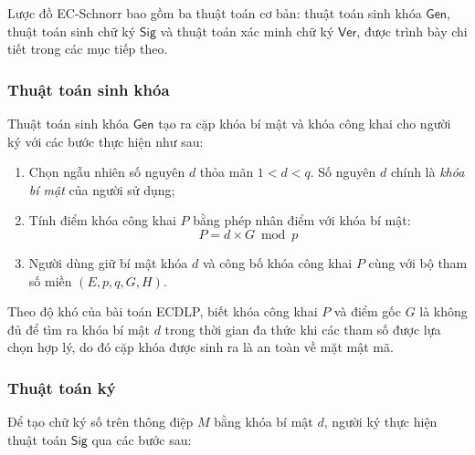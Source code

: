 Lược đồ EC-Schnorr bao gồm ba thuật toán cơ bản: thuật toán sinh khóa $\textsf{Gen}$, thuật toán sinh chữ ký $\textsf{Sig}$ và thuật toán xác minh chữ ký $\textsf{Ver}$, được trình bày chi tiết trong các mục tiếp theo.

\subsubsection{Thuật toán sinh khóa}

Thuật toán sinh khóa $\textsf{Gen}$ tạo ra cặp khóa bí mật và khóa công khai cho người ký với các bước thực hiện như sau:

\begin{enumerate}
    \item Chọn ngẫu nhiên số nguyên $d$ thỏa mãn $1 < d < q$. Số nguyên $d$ chính là \textit{khóa bí mật} của người sử dụng;
    \item Tính điểm khóa công khai $P$ bằng phép nhân điểm với khóa bí mật:
    \begin{equation}
        P = d \times G \bmod p
        \label{eq:ec-schnorr-keygen}
    \end{equation}
    \item Người dùng giữ bí mật khóa $d$ và công bố khóa công khai $P$ cùng với bộ tham số miền $(E, p, q, G, H)$.
\end{enumerate}

Theo độ khó của bài toán ECDLP, biết khóa công khai $P$ và điểm gốc $G$ là không đủ để tìm ra khóa bí mật $d$ trong thời gian đa thức khi các tham số được lựa chọn hợp lý, do đó cặp khóa được sinh ra là an toàn về mặt mật mã.

\subsubsection{Thuật toán ký}

Để tạo chữ ký số trên thông điệp $M$ bằng khóa bí mật $d$, người ký thực hiện thuật toán $\textsf{Sig}$ qua các bước sau:

